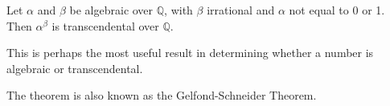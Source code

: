 \documentclass[12pt]{article}
\begin{document}
Let $\alpha$ and $\beta$ be algebraic over $\mathbb{Q}$, with $\beta$ irrational and $\alpha$ not equal to 0 or 1.  Then $\alpha^{\beta}$ is transcendental over $\mathbb{Q}$.

This is perhaps the most useful result in determining whether a number is algebraic or transcendental.

The theorem is also known as the Gelfond-Schneider Theorem.
\end{document}
